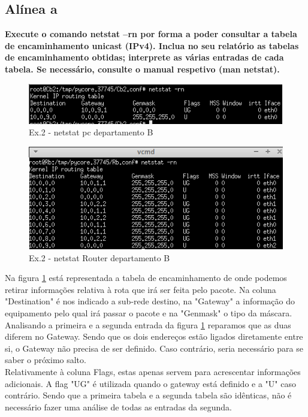 \documentclass[a4paper]{report}
\begin{document}
\subsection{Alínea a}
\textbf{Execute o comando netstat –rn por forma a poder consultar a tabela de
encaminhamento unicast (IPv4). Inclua no seu relatório as tabelas de encaminhamento
obtidas; interprete as várias entradas de cada tabela. Se necessário, consulte o manual
respetivo (man netstat).}

\begin{figure}[H]
    \centering 
    \includegraphics[width=\textwidth]{images/netstatPcEx2P2.png}
    \caption{Ex.2 - netstat pc departamento B}
    \label{fig:netstatPcEx2P2}
\end{figure}

\begin{figure}[H]
    \centering 
    \includegraphics[width=\textwidth]{images/netstatRouterEx2P2.png}
    \caption{Ex.2 - netstat Router departamento B}
    \label{fig:netstatRouterEx2P2}
\end{figure}
Na figura \ref{fig:netstatPcEx2P2} está representada a tabela de encaminhamento de onde
podemos retirar informações relativa à rota que irá ser feita pelo pacote.
Na coluna "Destination" é nos indicado a sub-rede destino, na "Gateway" a informação do
equipamento pelo qual irá passar o pacote e na "Genmask" o tipo da máscara.\\
Analisando a primeira e a segunda entrada da figura \ref{fig:netstatPcEx2P2} 
reparamos que as duas diferem no Gateway. Sendo que os dois endereços estão ligados
diretamente entre si, o Gateway não precisa de ser definido. Caso contrário, seria
necessário para se saber o próximo salto.\\
Relativamente à coluna Flags, estas apenas servem para acrescentar informações adicionais.
A flag "UG" é utilizada quando o gateway está definido e a "U" caso contrário.
Sendo que a primeira tabela e a segunda tabela são idênticas, não é necessário fazer
uma análise de todas as entradas da segunda.
\end{document}
